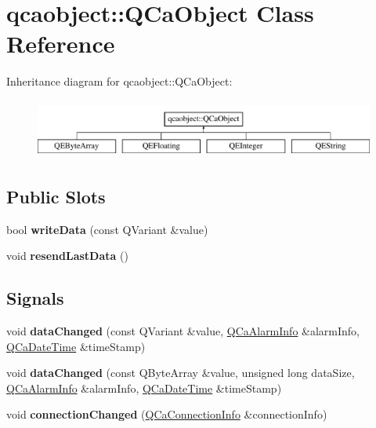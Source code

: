 \hypertarget{classqcaobject_1_1QCaObject}{
\section{qcaobject::QCaObject Class Reference}
\label{classqcaobject_1_1QCaObject}
}
Inheritance diagram for qcaobject::QCaObject:\begin{figure}[H]
\begin{center}
\leavevmode
\includegraphics[height=1.958042cm]{classqcaobject_1_1QCaObject}
\end{center}
\end{figure}
\subsection*{Public Slots}
\begin{DoxyCompactItemize}
\item 
\hypertarget{classqcaobject_1_1QCaObject_a5efdc960fb686d8f8f817565ca22d58e}{
bool {\bfseries writeData} (const QVariant \&value)}
\label{classqcaobject_1_1QCaObject_a5efdc960fb686d8f8f817565ca22d58e}

\item 
\hypertarget{classqcaobject_1_1QCaObject_a9806f80a37174198bd50ab4d26a5a1df}{
void {\bfseries resendLastData} ()}
\label{classqcaobject_1_1QCaObject_a9806f80a37174198bd50ab4d26a5a1df}

\end{DoxyCompactItemize}
\subsection*{Signals}
\begin{DoxyCompactItemize}
\item 
\hypertarget{classqcaobject_1_1QCaObject_ad129ff387042de33335d4b0e3d5292f7}{
void {\bfseries dataChanged} (const QVariant \&value, \hyperlink{classQCaAlarmInfo}{QCaAlarmInfo} \&alarmInfo, \hyperlink{classQCaDateTime}{QCaDateTime} \&timeStamp)}
\label{classqcaobject_1_1QCaObject_ad129ff387042de33335d4b0e3d5292f7}

\item 
\hypertarget{classqcaobject_1_1QCaObject_a7b131ebd51840824c7b7fcb35569590f}{
void {\bfseries dataChanged} (const QByteArray \&value, unsigned long dataSize, \hyperlink{classQCaAlarmInfo}{QCaAlarmInfo} \&alarmInfo, \hyperlink{classQCaDateTime}{QCaDateTime} \&timeStamp)}
\label{classqcaobject_1_1QCaObject_a7b131ebd51840824c7b7fcb35569590f}

\item 
\hypertarget{classqcaobject_1_1QCaObject_ad71c132f4aebc53792add56250283c21}{
void {\bfseries connectionChanged} (\hyperlink{classQCaConnectionInfo}{QCaConnectionInfo} \&connectionInfo)}
\label{classqcaobject_1_1QCaObject_ad71c132f4aebc53792add56250283c21}

\end{DoxyCompactItemize}
